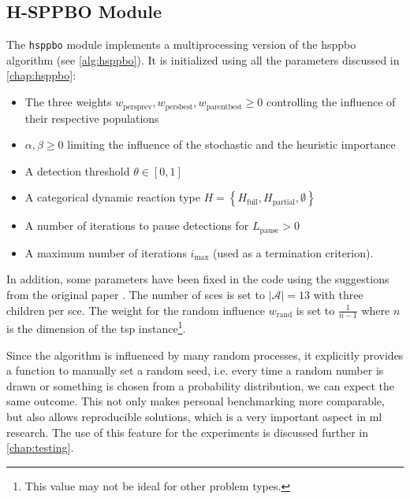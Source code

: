 \subsection{H-SPPBO Module}
\label{chap:hsppbo-module}
The \texttt{hsppbo} module implements a multiprocessing version of the \gls{hsppbo} algorithm (see \ref{alg:hsppbo}). It is initialized using all the parameters discussed in \cref{chap:hsppbo}:
\begin{itemize}
	\item The three weights $w_{\text{persprev}}, w_{\text{persbest}}, w_{\text{parentbest}} \geq 0$ controlling the influence of their respective populations
	\item $\alpha, \beta \geq 0$ limiting the influence of the stochastic and the heuristic importance
	\item A detection threshold $\theta \in [0,1]$
	\item A categorical dynamic reaction type $H = \left\lbrace H_{\text{full}}, H_{\text{partial}}, \emptyset \right\rbrace$
	\item A number of iterations to pause detections for $L_\text{pause} > 0$
	\item A maximum number of iterations $i_{\text{max}}$ (used as a termination criterion).
\end{itemize}

In addition, some parameters have been fixed in the code using the suggestions from the original paper \cite{kupfer2021hierarchical}. The number of \glspl{sce} is set to $|\mathcal{A}| = 13$ with three children per \gls{sce}. The weight for the random influence $w_\text{rand}$ is set to $\frac{1}{n-1}$ where $n$ is the dimension of the \gls{tsp} instance\footnote{This value may not be ideal for other problem types.}.

Since the algorithm is influenced by many random processes, it explicitly provides a function to manually set a random seed, i.e. every time a random number is drawn or something is chosen from a probability distribution, we can expect the same outcome. This not only makes personal benchmarking more comparable, but also allows reproducible solutions, which is a very important aspect in \gls{ml} research. The use of this feature for the experiments is discussed further in \cref{chap:testing}.

